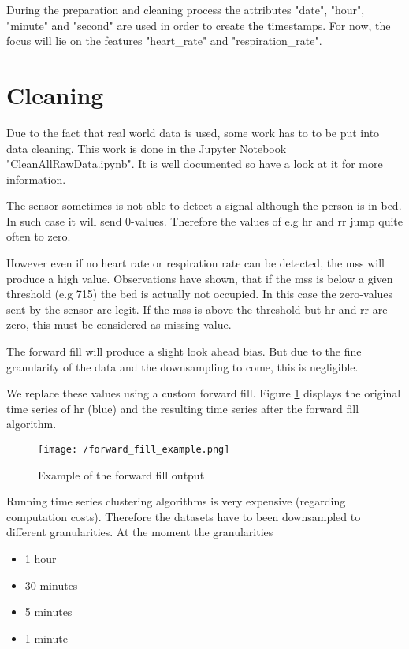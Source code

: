 During the preparation and cleaning process the attributes "date", "hour", "minute" and "second" are used in order to create the timestamps.
For now, the focus will lie on the features "heart\_rate" and "respiration\_rate".


\section{Cleaning}
Due to the fact that real world data is used, some work has to to be put into data cleaning. This work is done in the Jupyter Notebook "CleanAllRawData.ipynb". It is well documented so have a look at it for more information.


The sensor sometimes is not able to detect a signal although the person is in bed. In such case it will send 0-values. Therefore the values of e.g \ac{hr} and \ac{rr} jump quite often to zero.

However even if no heart rate or respiration rate can be detected, the \ac{mss} will produce a high value. Observations have shown, that if the \ac{mss} is below a given threshold (e.g 715) the bed is actually not occupied. In this case the zero-values sent by the sensor are legit. If the \ac{mss} is above the threshold but \ac{hr} and \ac{rr} are zero, this must be considered as missing value.

The forward fill will produce a slight look ahead bias. But due to the fine granularity of the data and the downsampling to come, this is negligible.

We replace these values using a custom forward fill. Figure \ref{fig:forward_fill_example} displays the original time series of \ac{hr} (blue) and the resulting time series after the forward fill algorithm.

\begin{figure}[h!]
	\texttt{[image: /forward\_fill\_example.png]}
	\caption{Example of the forward fill output}
	\label{fig:forward_fill_example}
\end{figure}


\newpage
Running time series clustering algorithms is very expensive (regarding computation costs). Therefore the datasets have to been downsampled to different granularities. At the moment the granularities 

\begin{itemize}
	\item 1 hour
	\item 30 minutes
	\item 5 minutes
	\item 1 minute
\end{itemize}

